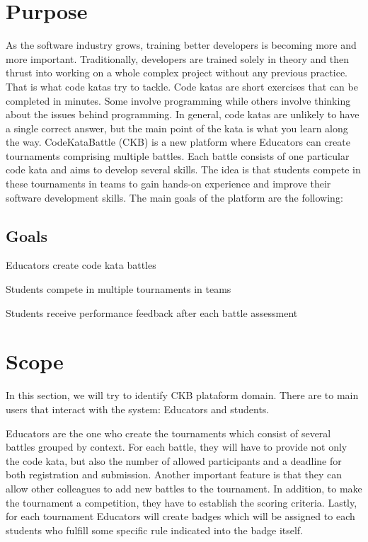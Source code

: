\section{Purpose}
As the software industry grows, training better developers is becoming more and more important. Traditionally, developers are trained solely in theory and then thrust into working on a whole complex project without any previous practice. That is what code katas try to tackle. Code katas are short exercises that can be completed in minutes. Some involve programming while others involve thinking about the issues behind programming. In general, code katas are unlikely to have a single correct answer, but the main point of the kata is what you learn along the way.
CodeKataBattle (CKB) is a new platform where Educators can create tournaments comprising multiple battles. Each battle consists of one particular code kata and aims to develop several skills. The idea is that students compete in these tournaments in teams to gain hands-on experience and improve their software development skills. The main goals of the platform are the following:

\subsection{Goals}
\begin{enumerate}[label={[G\arabic*]}]
    \item Educators create code kata battles 
    \item Students compete in multiple tournaments in teams
    \item Students receive performance feedback after each battle assessment%
\end{enumerate}

\section{Scope}
In this section, we will try to identify CKB plataform domain. 
There are to main users that interact with the system: Educators and students.

Educators are the one who create the tournaments which consist of several battles grouped by context. For each battle, they will have to provide not only the code kata, but also the number of allowed participants and a deadline for both registration and submission. Another important feature is that they can allow other colleagues to add new battles to the tournament. In addition, to make the tournament a competition, they have to establish the scoring criteria.
Lastly, for each tournament Educators will create badges which will be assigned to each students who fulfill some specific rule indicated into the badge itself.

